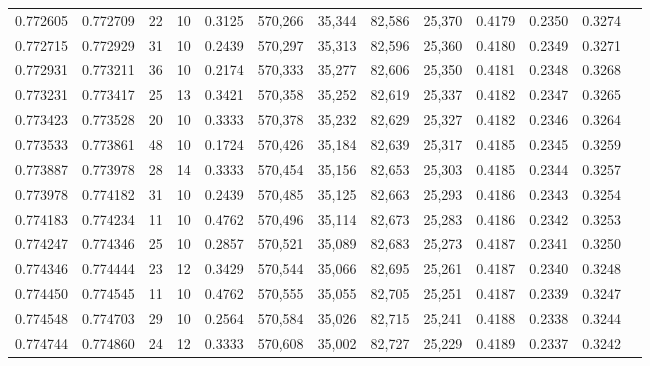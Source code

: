 \begin{tabular}{rrrrrrrrrrrrr}
0.772605 & 0.772709 &    22 &  10 &                                     0.3125 & 570,266 &  35,344 &  82,586 &  25,370 & 0.4179 & 0.2350 & 0.3274 \\
0.772715 & 0.772929 &    31 &  10 &                                     0.2439 & 570,297 &  35,313 &  82,596 &  25,360 & 0.4180 & 0.2349 & 0.3271 \\
0.772931 & 0.773211 &    36 &  10 &                                     0.2174 & 570,333 &  35,277 &  82,606 &  25,350 & 0.4181 & 0.2348 & 0.3268 \\
0.773231 & 0.773417 &    25 &  13 &                                     0.3421 & 570,358 &  35,252 &  82,619 &  25,337 & 0.4182 & 0.2347 & 0.3265 \\
0.773423 & 0.773528 &    20 &  10 &                                     0.3333 & 570,378 &  35,232 &  82,629 &  25,327 & 0.4182 & 0.2346 & 0.3264 \\
0.773533 & 0.773861 &    48 &  10 &                                     0.1724 & 570,426 &  35,184 &  82,639 &  25,317 & 0.4185 & 0.2345 & 0.3259 \\
0.773887 & 0.773978 &    28 &  14 &                                     0.3333 & 570,454 &  35,156 &  82,653 &  25,303 & 0.4185 & 0.2344 & 0.3257 \\
0.773978 & 0.774182 &    31 &  10 &                                     0.2439 & 570,485 &  35,125 &  82,663 &  25,293 & 0.4186 & 0.2343 & 0.3254 \\
0.774183 & 0.774234 &    11 &  10 &                                     0.4762 & 570,496 &  35,114 &  82,673 &  25,283 & 0.4186 & 0.2342 & 0.3253 \\
0.774247 & 0.774346 &    25 &  10 &                                     0.2857 & 570,521 &  35,089 &  82,683 &  25,273 & 0.4187 & 0.2341 & 0.3250 \\
0.774346 & 0.774444 &    23 &  12 &                                     0.3429 & 570,544 &  35,066 &  82,695 &  25,261 & 0.4187 & 0.2340 & 0.3248 \\
0.774450 & 0.774545 &    11 &  10 &                                     0.4762 & 570,555 &  35,055 &  82,705 &  25,251 & 0.4187 & 0.2339 & 0.3247 \\
0.774548 & 0.774703 &    29 &  10 &                                     0.2564 & 570,584 &  35,026 &  82,715 &  25,241 & 0.4188 & 0.2338 & 0.3244 \\
0.774744 & 0.774860 &    24 &  12 &                                     0.3333 & 570,608 &  35,002 &  82,727 &  25,229 & 0.4189 & 0.2337 & 0.3242 \\

\end{tabular}
